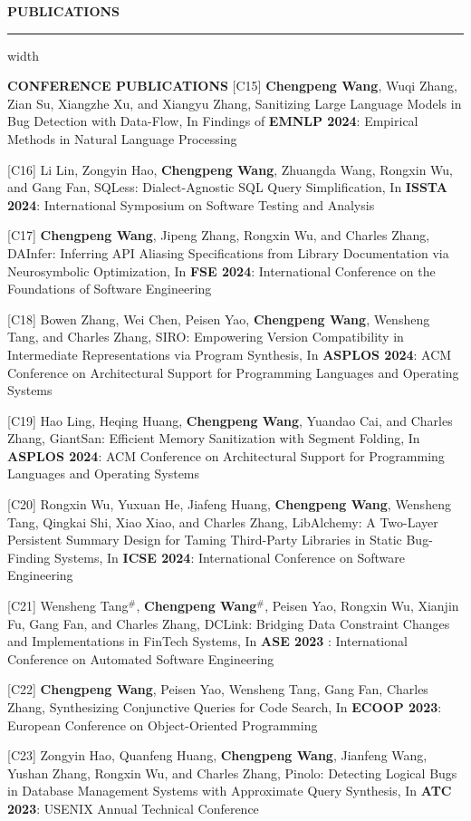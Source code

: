 \documentclass[centered]{resume}
\newlength{\cvsectiongap}
\newenvironment{rSection}[1]{%
  \par\Needspace{5\baselineskip}\addvspace{\cvsectiongap}
  {\bfseries \MakeUppercase{#1}}\vspace{0.65em}%
  \noindent\hrule width \linewidth\vspace{-0.45em}\par
}{\par}
\newenvironment{subsection*}[4]{%
  \par\Needspace{5\baselineskip}\noindent #1\par\nobreak
}{}
\begin{document}
\begin{resume}
\begin{rSection}{Publications}
\begin{subsection*}{\textbf{CONFERENCE PUBLICATIONS}}{}{}{}
[C15] \textbf{Chengpeng Wang}, Wuqi Zhang, Zian Su, Xiangzhe Xu, and Xiangyu Zhang, Sanitizing Large Language Models in Bug Detection with Data-Flow, In Findings of \textbf{EMNLP 2024}: Empirical Methods in Natural Language Processing

[C16] Li Lin, Zongyin Hao, \textbf{Chengpeng Wang}, Zhuangda Wang, Rongxin Wu, and Gang Fan, SQLess: Dialect-Agnostic SQL Query Simplification, In \textbf{ISSTA 2024}: International Symposium on Software Testing and Analysis

[C17] \textbf{Chengpeng Wang}, Jipeng Zhang, Rongxin Wu, and Charles Zhang, DAInfer: Inferring API Aliasing Specifications from Library Documentation via Neurosymbolic Optimization, In \textbf{FSE 2024}: International Conference on the Foundations of Software Engineering

[C18] Bowen Zhang, Wei Chen, Peisen Yao, \textbf{Chengpeng Wang}, Wensheng Tang, and Charles Zhang, SIRO: Empowering Version Compatibility in Intermediate Representations via Program Synthesis, In \textbf{ASPLOS 2024}: ACM Conference on Architectural Support for Programming Languages and Operating Systems

[C19] Hao Ling, Heqing Huang, \textbf{Chengpeng Wang}, Yuandao Cai, and Charles Zhang, GiantSan: Efficient Memory Sanitization with Segment Folding, In \textbf{ASPLOS 2024}: ACM Conference on Architectural Support for Programming Languages and Operating Systems

[C20] Rongxin Wu, Yuxuan He, Jiafeng Huang, \textbf{Chengpeng Wang}, Wensheng Tang, Qingkai Shi, Xiao Xiao, and Charles Zhang, LibAlchemy: A Two-Layer Persistent Summary Design for Taming Third-Party Libraries in Static Bug-Finding Systems, In \textbf{ICSE 2024}: International Conference on Software Engineering

[C21] Wensheng Tang$^\#$, \textbf{Chengpeng Wang}$^\#$, Peisen Yao, Rongxin Wu, Xianjin Fu, Gang Fan, and Charles Zhang, DCLink: Bridging Data Constraint Changes and Implementations in FinTech Systems, In \textbf{ASE 2023} : International Conference on Automated Software Engineering

[C22] \textbf{Chengpeng Wang}, Peisen Yao, Wensheng Tang, Gang Fan, Charles Zhang, Synthesizing Conjunctive Queries for Code Search, In \textbf{ECOOP 2023}: European Conference on Object-Oriented Programming

[C23] Zongyin Hao, Quanfeng Huang, \textbf{Chengpeng Wang}, Jianfeng Wang, Yushan Zhang, Rongxin Wu, and Charles Zhang, Pinolo: Detecting Logical Bugs in Database Management Systems with Approximate Query Synthesis, In \textbf{ATC 2023}: USENIX Annual Technical Conference


\end{subsection*}
\end{rSection}
\end{resume}
\end{document}
